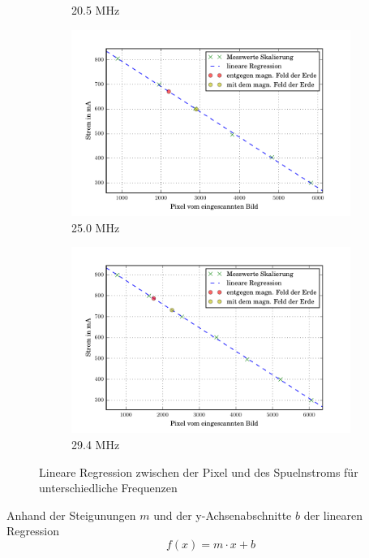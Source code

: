 \begin{figure}
\begin{subfigure}[b]{0.49\textwidth}
     \caption{20.5 MHz}
     \label{fig:20Reg}
  \end{subfigure}
  \begin{subfigure}[b]{0.49\textwidth}
     \includegraphics[width=\textwidth]{picture/25MHz.pdf}
     \caption{25.0 MHz}
     \label{fig:20Reg}
  \end{subfigure}
  \begin{subfigure}[b]{0.49\textwidth}
     \includegraphics[width=\textwidth]{picture/30MHz.pdf}
     \caption{29.4 MHz}
     \label{fig:30Reg}
  \end{subfigure}
  \caption{Lineare Regression zwischen der Pixel und des Spuelnstroms für unterschiedliche Frequenzen}
  \label{fig:Reg}
\end{figure} 
Anhand der Steigunungen $m$ und der y-Achsenabschnitte $b$ der linearen Regression
\begin{equation}
  f(x) = m \cdot x + b
  \label{eqn:Reg}
\end{equation}
